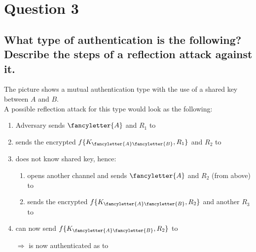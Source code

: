\documentclass{report}
\begin{document}
	\section{Question 3}
	\startsection
		\renewcommand{\thesubsection}{\thesection.\Alph{subsection}}
		\subsection{What type of authentication is the following? Describe the steps of a reflection attack against it.}
		\startsubsection
			The picture shows a mutual authentication type with the use of a shared key between $A$ and $B$. \\
			A possible reflection attack for this type would look as the following:
			\begin{enumerate}
				\item Adversary  sends $\fancyletter{A}$ and $R_1$ to 
				\item {} sends the encrypted $f\{K_{\fancyletter{A}\fancyletter{B}}, R_1\}$ and $R_2$ to 
				\item {} does not know shared key, hence:
				\begin{enumerate}
					\item {} opens another channel and sends $\fancyletter{A}$ and $R_2$ (from above) to 
					\item {} sends the encrypted $f\{K_{\fancyletter{A}\fancyletter{B}}, R_2\}$ and another $R_3$ to 
				\end{enumerate}
				\item {} can now send $f\{K_{\fancyletter{A}\fancyletter{B}}, R_2\}$ to 
				\item[$\Rightarrow$]  is now authenticated as  to 
			\end{enumerate}
		\closesection
		
\end{document}
